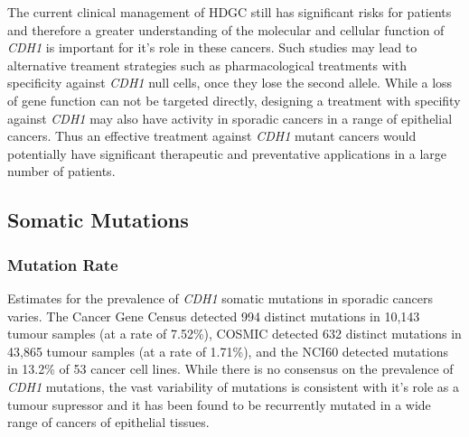 The current clinical management of HDGC still has significant risks for patients and therefore a greater understanding of the molecular and cellular function of \textit{CDH1} is important for it's role in these cancers. Such studies may lead to alternative treament strategies such as pharmacological treatments with specificity against \textit{CDH1} null cells, once they lose the second allele. While a loss of gene function can not be targeted directly, designing a treatment with specifity against \textit{CDH1} may also have activity in sporadic cancers in a range of epithelial cancers. Thus an effective treatment against \textit{CDH1} mutant cancers would potentially have significant therapeutic and preventative applications in a large number of patients.

\subsection{Somatic Mutations}
\subsubsection{Mutation Rate}

Estimates for the prevalence of \textit{CDH1} somatic mutations  in sporadic cancers varies. The Cancer Gene Census detected 994 distinct mutations in 10,143 tumour samples (at a rate of 7.52\%), COSMIC detected 632 distinct mutations in 43,865 tumour samples (at a rate of 1.71\%), and the NCI60 detected mutations in 13.2\% of 53 cancer cell lines. While there is no consensus on the prevalence of \textit{CDH1} mutations, the vast variability of mutations is consistent with it's role as a tumour supressor and it has been found to be recurrently mutated in a wide range of cancers of epithelial tissues.

